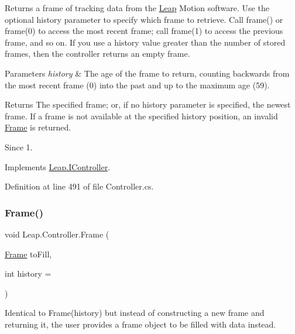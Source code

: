 Returns a frame of tracking data from the \mbox{\hyperlink{namespace_leap}{Leap}} Motion software. Use the optional history parameter to specify which frame to retrieve. Call frame() or frame(0) to access the most recent frame; call frame(1) to access the previous frame, and so on. If you use a history value greater than the number of stored frames, then the controller returns an empty frame.


\begin{DoxyParams}{Parameters}
{\em history} & The age of the frame to return, counting backwards from the most recent frame (0) into the past and up to the maximum age (59). \\
\hline
\end{DoxyParams}
\begin{DoxyReturn}{Returns}
The specified frame; or, if no history parameter is specified, the newest frame. If a frame is not available at the specified history position, an invalid \mbox{\hyperlink{class_leap_1_1_frame}{Frame}} is returned. 
\end{DoxyReturn}
\begin{DoxySince}{Since}
1. 
\end{DoxySince}


Implements \mbox{\hyperlink{interface_leap_1_1_i_controller_a0f8fe519944cc39eae5cf0d3caeaa33c}{Leap.\+I\+Controller}}.



Definition at line 491 of file Controller.\+cs.

\mbox{\label{class_leap_1_1_controller_acab28236972c254e53d3508cb8aaa1cd}} 
\subsubsection{\texorpdfstring{Frame()}{Frame()}\hspace{0.1cm}{\footnotesize\ttfamily [2/2]}}
{\footnotesize\ttfamily void Leap.\+Controller.\+Frame (\begin{DoxyParamCaption}\item[{\mbox{\hyperlink{class_leap_1_1_frame}{Frame}}}]{to\+Fill,  }\item[{int}]{history = {} }\end{DoxyParamCaption})}



Identical to Frame(history) but instead of constructing a new frame and returning it, the user provides a frame object to be filled with data instead. 



